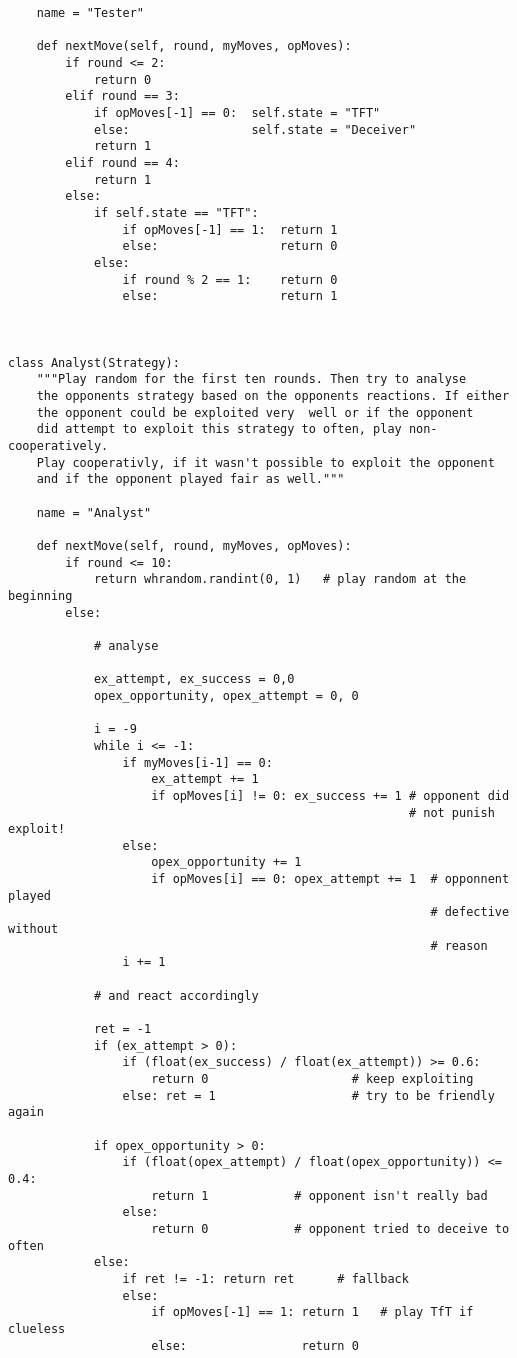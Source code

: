 \documentclass[12pt,a4paper,ngerman]{article}
\begin{document}
\begin{scriptsize}
\begin{verbatim}
    name = "Tester"

    def nextMove(self, round, myMoves, opMoves):
        if round <= 2:
            return 0
        elif round == 3:
            if opMoves[-1] == 0:  self.state = "TFT"
            else:                 self.state = "Deceiver"
            return 1
        elif round == 4:
            return 1
        else:
            if self.state == "TFT":
                if opMoves[-1] == 1:  return 1
                else:                 return 0
            else:
                if round % 2 == 1:    return 0
                else:                 return 1


        
class Analyst(Strategy):
    """Play random for the first ten rounds. Then try to analyse 
    the opponents strategy based on the opponents reactions. If either
    the opponent could be exploited very  well or if the opponent 
    did attempt to exploit this strategy to often, play non-cooperatively.
    Play cooperativly, if it wasn't possible to exploit the opponent
    and if the opponent played fair as well."""

    name = "Analyst"

    def nextMove(self, round, myMoves, opMoves):
        if round <= 10:
            return whrandom.randint(0, 1)   # play random at the beginning
        else:

            # analyse

            ex_attempt, ex_success = 0,0
            opex_opportunity, opex_attempt = 0, 0

            i = -9
            while i <= -1:
                if myMoves[i-1] == 0:
                    ex_attempt += 1
                    if opMoves[i] != 0: ex_success += 1 # opponent did
                                                        # not punish exploit!
                else:
                    opex_opportunity += 1
                    if opMoves[i] == 0: opex_attempt += 1  # opponnent played
                                                           # defective without
                                                           # reason
                i += 1

            # and react accordingly

            ret = -1
            if (ex_attempt > 0):
                if (float(ex_success) / float(ex_attempt)) >= 0.6:
                    return 0                    # keep exploiting
                else: ret = 1                   # try to be friendly again

            if opex_opportunity > 0:
                if (float(opex_attempt) / float(opex_opportunity)) <= 0.4:
                    return 1            # opponent isn't really bad
                else:
                    return 0            # opponent tried to deceive to often
            else:
                if ret != -1: return ret      # fallback
                else:
                    if opMoves[-1] == 1: return 1   # play TfT if clueless
                    else:                return 0

\end{verbatim}
\end{scriptsize}
\end{document}
